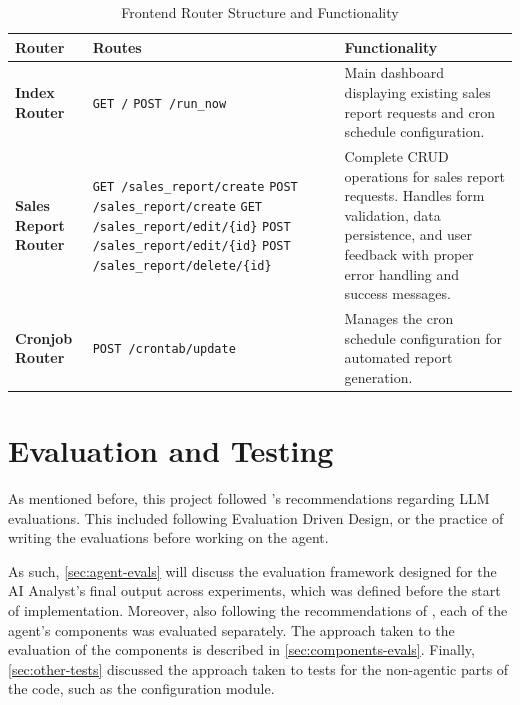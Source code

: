 \documentclass[a4paper]{report}
\begin{document}
\begin{table}[H]
\centering
\begin{tabular}{|p{3cm}|p{5.5cm}|p{6cm}|}
\hline
\textbf{Router} & \textbf{Routes} & \textbf{Functionality} \\ \hline
\textbf{Index Router} & 
\texttt{GET /} \newline \texttt{POST /run\_now} & 
Main dashboard displaying existing sales report requests and cron schedule configuration. \\ \hline
\textbf{Sales Report Router} & 
\texttt{GET /sales\_report/create} \newline \texttt{POST /sales\_report/create} \newline \texttt{GET /sales\_report/edit/\{id\}} \newline \texttt{POST /sales\_report/edit/\{id\}} \newline \texttt{POST /sales\_report/delete/\{id\}} & 
Complete CRUD operations for sales report requests. Handles form validation, data persistence, and user feedback with proper error handling and success messages. \\ \hline

\textbf{Cronjob Router} & 
\texttt{POST /crontab/update} & 
Manages the cron schedule configuration for automated report generation. \\ \hline
\end{tabular}
\caption{Frontend Router Structure and Functionality}
\label{tab:frontend-routes}
\end{table}

\chapter{Evaluation and Testing}
\label{chapter:evaluation-testing}

As mentioned before, this project followed \cite{aiebook2025}'s recommendations regarding LLM evaluations. This included following Evaluation Driven Design, or the practice of writing the evaluations before working on the agent.

As such, \autoref{sec:agent-evals} will discuss the evaluation framework designed for the AI Analyst's final output across experiments, which was defined before the start of implementation. Moreover, also following the recommendations of \cite{aiebook2025}, each of the agent's components was evaluated separately. The approach taken to the evaluation of the components is described in \autoref{sec:components-evals}. Finally, \autoref{sec:other-tests} discussed the approach taken to tests for the non-agentic parts of the code, such as the configuration module.
\end{document}

